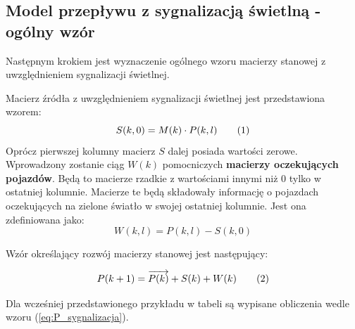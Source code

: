 \documentclass[12pt]{book}
\newcommand\addtag{\refstepcounter{equation}
\tag{\theequation}}
\begin{document}
\subsection{Model przepływu z sygnalizacją świetlną - ogólny wzór}

Następnym krokiem jest wyznaczenie ogólnego wzoru macierzy stanowej z uwzględnieniem sygnalizacji świetlnej. 
\begin{tcolorbox}
Macierz źródła z uwzględnieniem sygnalizacji świetlnej jest przedstawiona wzorem:
\[S(k,0)=M(k) \cdot P(k,l) \addtag \label{eq:S} \]
Oprócz pierwszej kolumny macierz $S$ dalej posiada wartości zerowe.\\
Wprowadzony zostanie ciąg $W(k)$ pomocniczych \textbf{macierzy oczekujących pojazdów}. Będą to macierze rzadkie z wartościami innymi niż 0 tylko w ostatniej kolumnie. Macierze te będą składowały informację o pojazdach oczekujących na zielone światło w swojej ostatniej kolumnie. Jest ona zdefiniowana jako:
\[W(k,l)=P(k,l)-S(k,0)\]

Wzór określający rozwój macierzy stanowej jest następujący:

\[P(k+1)=\overrightarrow{P(k)} + S(k) + W(k) \addtag \label{eq:P_sygnalizacja}\]
\end{tcolorbox}
\newpage 
Dla wcześniej przedstawionego przykładu w tabeli są wypisane obliczenia wedle wzoru (\ref{eq:P_sygnalizacja}).

\def \PZero { $\begin{bmatrix}
0 & 1 & 0 & \textbf{1}  \\
0 & 1 & 0 & 1  \\
1 & 0 & 0 & 0  
\end{bmatrix}$
}
\def \PmovedZero {
$\begin{bmatrix}
0 & 0 & 1 & 0  \\
0 & 0 & 1 & 0  \\
0 & 1 & 0 & 0  
\end{bmatrix}$
}
\def \SZero {
$\begin{bmatrix}
1 \\
0 \\
0   
\end{bmatrix}$

}
\def \WZero {
$\begin{bmatrix}
0  \\
1  \\
0  
\end{bmatrix}$
}
\def \MZero {$\begin{bmatrix}
  0 & 0 & 0 \\
       0 & 0 & 0\\
       1 & 0 & 0 \\
\end{bmatrix}$}
\end{document}
